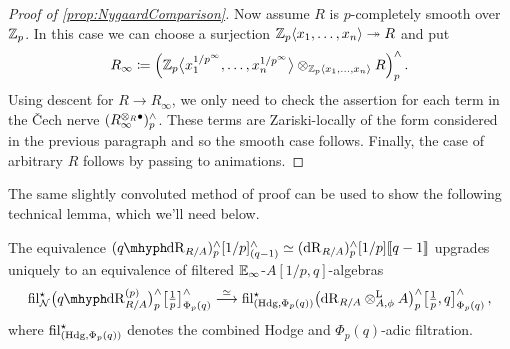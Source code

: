 \documentclass[DIV=12,numbers=enddot,leqno,bibliography=totoc]{scrartcl}
\begin{document}
\begin{proof}[Proof of \cref{prop:NygaardComparison}]
		Now assume $R$ is $p$-completely smooth over $\mathbb{Z}_p$. In this case we can choose a surjection $\mathbb{Z}_p\langle x_1,\dotsc,x_n\rangle\twoheadrightarrow R$ and put
		\begin{equation*}
			R_\infty\coloneqq \left(\IZ_p\bigl\langle x_1^{1/p^\infty},\dotsc,x_n^{1/p^\infty}\bigr\rangle\otimes_{\IZ_p\langle x_1,\dotsc,x_n\rangle}R\right)_p^\complete\,.
		\end{equation*}
		Using descent for $R\rightarrow R_\infty$, we only need to check the assertion for each term in the \v Cech nerve $(R_\infty^{\otimes_R\bullet})_p^\wedge$. These terms are Zariski-locally of the form considered in the previous paragraph and so the smooth case follows. Finally, the case of arbitrary $R$ follows by passing to animations.
	\end{proof}
	The same slightly convoluted method of proof can be used to show the following technical lemma, which we'll need below.
	\begin{lem}\label{lem:NygaardRationalisation}
		The equivalence $(\qdeRham_{R/A})_p^\complete[1/p]_{(q-1)}^\complete\simeq (\deRham_{R/A})_p^\complete[1/p]\qpower$ upgrades uniquely to an equivalence of filtered $\mathbb{E}_\infty$-$A[1/p,q]$-algebras
		\begin{equation*}
			\fil_\Nn^\star \bigl(\qdeRham_{R/A}^{(p)}\bigr)_p^\complete\bigl[\localise{p}\bigr]_{\Phi_p(q)}^\complete\overset{\simeq}{\longrightarrow} \fil_{(\Hodge,\Phi_p(q))}^\star \bigl(\deRham_{R/A}\lotimes_{A,\phi}A\bigr)_p^\complete\bigl[\localise{p},q\bigr]_{\Phi_p(q)}^\complete\,,
		\end{equation*}
		where $ \operatorname{fil}_{(\mathrm{Hdg},\Phi_p(q))}^\star $ denotes the combined Hodge and $\Phi_p(q)$-adic filtration.
	\end{lem}
\end{document}

